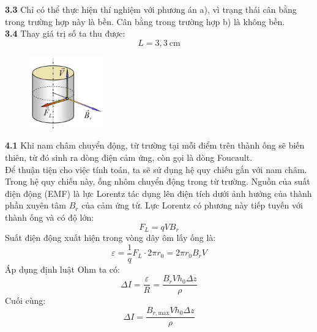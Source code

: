 \noindent\textbf{3.3} Chỉ có thể thực hiện thí nghiệm với phương án a), vì trạng thái cân bằng trong trường hợp này là bền. Cân bằng trong trường hợp b) là không bền.\\

\noindent\textbf{3.4} Thay giá trị số ta thu được:
\begin{equation*}
  L = 3{,}3~\text{cm}
\end{equation*}

\begin{figure}
  \centering
  \vspace{-0.5cm}
  \includegraphics[width=0.28\textwidth]{Figures/Solutions/Fig 2.8.png}
\end{figure}
\noindent\textbf{4.1} Khi nam châm chuyển động, từ trường tại mỗi điểm trên thành ống sẽ biến thiên, từ đó sinh ra dòng điện cảm ứng, còn gọi là dòng Foucault.\\
\indent Để thuận tiện cho việc tính toán, ta sẽ sử dụng hệ quy chiếu gắn với nam châm. Trong hệ quy chiếu này, ống nhôm chuyển động trong từ trường. Nguồn của suất điện động (EMF) là lực Lorentz tác dụng lên điện tích dưới ảnh hưởng của thành phần xuyên tâm $B_r$ của cảm ứng từ. Lực Lorentz có phương này tiếp tuyến với thành ống và có độ lớn:
\begin{equation*}
  F_L = q V B_r
\end{equation*}
Suất điện động xuất hiện trong vòng dây ôm lấy ống là:
\begin{equation*}
  \varepsilon = \frac{1}{q} F_L \cdot 2\pi r_0 = 2\pi r_0 B_r V
\end{equation*}
Áp dụng định luật Ohm ta có:
\begin{equation*}
  \Delta I = \frac{\varepsilon}{R} = \frac{B_r V h_0 \Delta z}{\rho}
\end{equation*}
Cuối cùng:
\begin{equation*}
  \Delta I = \frac{B_{r,\text{max}} V h_0 \Delta z}{\rho}
\end{equation*}

